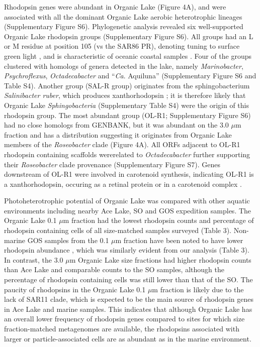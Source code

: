 Rhodopsin genes were abundant in Organic Lake (Figure 4A), and were associated with all the dominant Organic Lake aerobic heterotrophic lineages (Supplementary Figure S6). 
Phylogenetic analysis revealed six well-supported Organic Lake rhodopsin groups (Supplementary Figure S6). 
All groups had an L or M residue at position 105 (vs the SAR86 \ac{PR}), denoting tuning to surface green light \cite{Man2003, Gomez-Consarnau2007}, and is characteristic of oceanic coastal samples \cite{Rusch2007}. 
Four of the groups clustered with homologs of genera detected in the lake, namely \emph{Marinobacter}, \emph{Psychroflexus}, \emph{Octadecabacter} and ``\emph{Ca}. Aquiluna'' (Supplementary Figure S6 and Table S4). 
Another group (SAL-R group) originates from the sphingobacterium \emph{Salinibacter ruber}, which produces xanthorhodopsin \cite{Balashov2005}; it is therefore likely that Organic Lake \emph{Sphingobacteria} (Supplementary Table S4) were the origin of this rhodopsin group. 
The most abundant group (OL-R1; Supplementary Figure S6) had no close homologs from GENBANK, but it was abundant on the 3.0 $\mu$m fraction and has a distribution suggesting it originates from Organic Lake members of the \emph{Roseobacter} clade (Figure 4A). 
All \acp{ORF} adjacent to OL-R1 rhodopsin containing scaffolds wererelated to \emph{Octadecabacter} further supporting their \emph{Roseobacter} clade provenance (Supplementary Figure S7). 
Genes downstream of OL-R1 were involved in carotenoid synthesis, indicating OL-R1 is a xanthorhodopsin, occuring as a retinal protein or in a carotenoid complex \cite{Balashov2005}. %

Photoheterotrophic potential of Organic Lake was compared with other aquatic environments including nearby Ace Lake, \ac{SO} and \ac{GOS} expedition samples. 
The Organic Lake 0.1 $\mu$m fraction had the lowest rhodopsin counts and percentage of rhodopsin containing cells of all size-matched samples surveyed (Table 3). 
Non-marine \ac{GOS} samples from the 0.1 $\mu$m fraction have been noted to have lower rhodopsin abundance \cite{Sharma2008}, which was similarly evident from our analysis (Table 3). 
In contrast, the 3.0 $\mu$m Organic Lake size fractions had higher rhodopsin counts than Ace Lake and comparable counts to the \ac{SO} samples, although the percentage of rhodopsin containing cells was still lower than that of the \ac{SO}. 
The paucity of rhodopsins in the Organic Lake 0.1 $\mu$m fraction is likely due to the lack of SAR11 clade, which is expected to be the main source of rhodopsin genes in Ace Lake and marine samples. 
This indicates that although Organic Lake has an overall lower frequency of rhodopsin genes compared to sites for which size fraction-matched metagenomes are available, the rhodopsins associated with larger or particle-associated cells are as abundant as in the marine environment.

